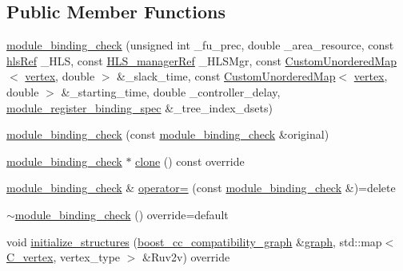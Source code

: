 \subsection*{Public Member Functions}
\begin{DoxyCompactItemize}
\item 
\hyperlink{structmodule__binding__check_a2a39df26580579c42fc5a1e7d7a05311}{module\+\_\+binding\+\_\+check} (unsigned int \+\_\+fu\+\_\+prec, double \+\_\+area\+\_\+resource, const \hyperlink{hls_8hpp_a75d0c73923d0ddfa28c4843a802c73a7}{hls\+Ref} \+\_\+\+H\+LS, const \hyperlink{hls__manager_8hpp_acd3842b8589fe52c08fc0b2fcc813bfe}{H\+L\+S\+\_\+manager\+Ref} \+\_\+\+H\+L\+S\+Mgr, const \hyperlink{custom__map_8hpp_ad1ed68f2ff093683ab1a33522b144adc}{Custom\+Unordered\+Map}$<$ \hyperlink{graph_8hpp_abefdcf0544e601805af44eca032cca14}{vertex}, double $>$ \&\+\_\+slack\+\_\+time, const \hyperlink{custom__map_8hpp_ad1ed68f2ff093683ab1a33522b144adc}{Custom\+Unordered\+Map}$<$ \hyperlink{graph_8hpp_abefdcf0544e601805af44eca032cca14}{vertex}, double $>$ \&\+\_\+starting\+\_\+time, double \+\_\+controller\+\_\+delay, \hyperlink{classmodule__register__binding__spec}{module\+\_\+register\+\_\+binding\+\_\+spec} \&\+\_\+tree\+\_\+index\+\_\+dsets)
\item 
\hyperlink{structmodule__binding__check_a6f50b5b2a0f312e676f426a83cae91df}{module\+\_\+binding\+\_\+check} (const \hyperlink{structmodule__binding__check}{module\+\_\+binding\+\_\+check} \&original)
\item 
\hyperlink{structmodule__binding__check}{module\+\_\+binding\+\_\+check} $\ast$ \hyperlink{structmodule__binding__check_a90b355e641f9f90ee4e1c2d1bf7d8929}{clone} () const override
\item 
\hyperlink{structmodule__binding__check}{module\+\_\+binding\+\_\+check} \& \hyperlink{structmodule__binding__check_a5574b327197e323b7e422e7ee8f43ad7}{operator=} (const \hyperlink{structmodule__binding__check}{module\+\_\+binding\+\_\+check} \&)=delete
\item 
\hyperlink{structmodule__binding__check_a80b590960dbdf52cd5ee91becac20edc}{$\sim$module\+\_\+binding\+\_\+check} () override=default
\item 
void \hyperlink{structmodule__binding__check_ac6f4b1e840b4bd490be992756f3c8c0e}{initialize\+\_\+structures} (\hyperlink{clique__covering__graph_8hpp_af47b1c28cf9a2c360afafb8d80582ce6}{boost\+\_\+cc\+\_\+compatibility\+\_\+graph} \&\hyperlink{structgraph}{graph}, std\+::map$<$ \hyperlink{clique__covering__graph_8hpp_a9cb45047ea8c5ed95a8cfa90494345aa}{C\+\_\+vertex}, vertex\+\_\+type $>$ \&Ruv2v) override

\end{DoxyCompactItemize}
